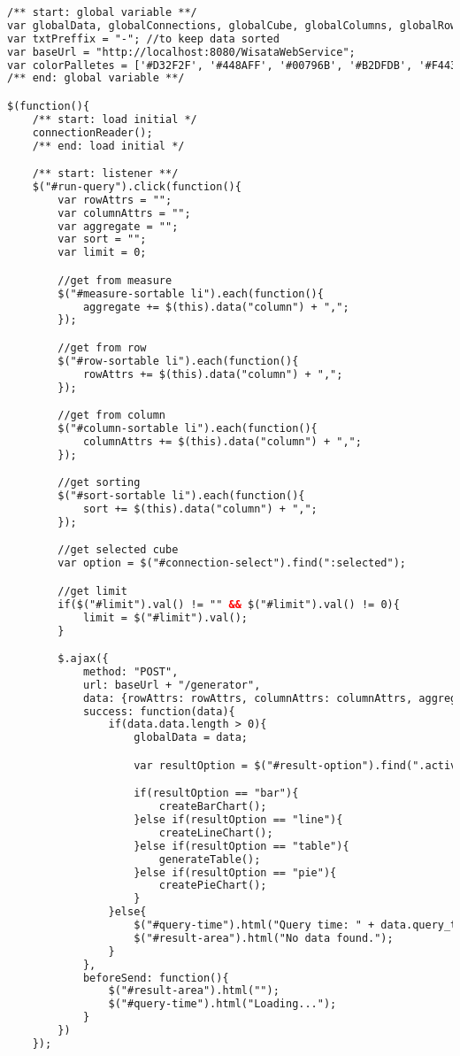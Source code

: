 \begin{lstlisting}[language=HTML,basicstyle=\tiny,caption=script.js]
/** start: global variable **/
var globalData, globalConnections, globalCube, globalColumns, globalRows, globalIndex, globalRowIndex, globalColumnIndex, globalMaps;
var txtPreffix = "-"; //to keep data sorted
var baseUrl = "http://localhost:8080/WisataWebService";
var colorPalletes = ['#D32F2F', '#448AFF', '#00796B', '#B2DFDB', '#F44336', '#FFEB3B', '#689F38'];
/** end: global variable **/

$(function(){
    /** start: load initial */
    connectionReader();
    /** end: load initial */

    /** start: listener **/
    $("#run-query").click(function(){
        var rowAttrs = "";
        var columnAttrs = "";
        var aggregate = "";
        var sort = "";
        var limit = 0;

        //get from measure
        $("#measure-sortable li").each(function(){
            aggregate += $(this).data("column") + ",";
        });

        //get from row
        $("#row-sortable li").each(function(){
            rowAttrs += $(this).data("column") + ",";
        });

        //get from column
        $("#column-sortable li").each(function(){
            columnAttrs += $(this).data("column") + ",";
        });

        //get sorting
        $("#sort-sortable li").each(function(){
            sort += $(this).data("column") + ",";
        });

        //get selected cube
        var option = $("#connection-select").find(":selected");

        //get limit
        if($("#limit").val() != "" && $("#limit").val() != 0){
            limit = $("#limit").val();
        }

        $.ajax({
            method: "POST",
            url: baseUrl + "/generator",
            data: {rowAttrs: rowAttrs, columnAttrs: columnAttrs, aggregate: aggregate, condition: $("#filter").val(), having: $("#having").val(), limit: limit, sort: sort, connectionId: option.data("connection"), cubeId: option.data("cube")},
            success: function(data){
                if(data.data.length > 0){
                    globalData = data;

                    var resultOption = $("#result-option").find(".active").data("type");

                    if(resultOption == "bar"){
                        createBarChart();
                    }else if(resultOption == "line"){
                        createLineChart();
                    }else if(resultOption == "table"){
                        generateTable();
                    }else if(resultOption == "pie"){
                        createPieChart();
                    }
                }else{
                    $("#query-time").html("Query time: " + data.query_time / 1000 + "s");
                    $("#result-area").html("No data found.");
                }
            },
            beforeSend: function(){
                $("#result-area").html("");
                $("#query-time").html("Loading...");
            }
        })
    });


\end{lstlisting}
